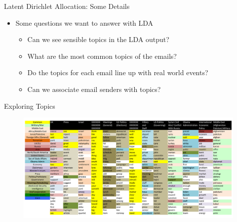 \documentclass[handout,13pt]{beamer}
\begin{document}
\begin{frame}{Latent Dirichlet Allocation: Some Details}
\begin{itemize}
\item Some questions we want to answer with LDA
\begin{itemize}
\item Can we see sensible topics in the LDA output?
\item What are the most common topics of the emails?
\item Do the topics for each email line up with real world events?
\item Can we associate email senders with topics?
\end{itemize}
\end{itemize}
\end{frame}


\begin{frame}{Exploring Topics}
\begin{figure}[h]
\centering
\includegraphics[width=0.99\linewidth]{../images/topic_words.pdf}
\label{fig:topics}
\end{figure}
\end{frame}
\end{document}
